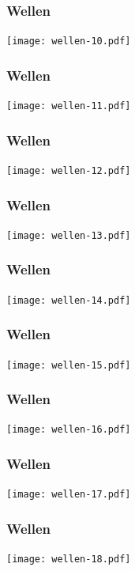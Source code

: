 \documentclass{beamer}
\begin{document}
\begin{frame}
\frametitle{Wellen}
\begin{center}
\texttt{[image: wellen-10.pdf]}
\end{center}
\end{frame}

\begin{frame}
\frametitle{Wellen}
\begin{center}
\texttt{[image: wellen-11.pdf]}
\end{center}
\end{frame}

\begin{frame}
\frametitle{Wellen}
\begin{center}
\texttt{[image: wellen-12.pdf]}
\end{center}
\end{frame}

\begin{frame}
\frametitle{Wellen}
\begin{center}
\texttt{[image: wellen-13.pdf]}
\end{center}
\end{frame}

\begin{frame}
\frametitle{Wellen}
\begin{center}
\texttt{[image: wellen-14.pdf]}
\end{center}
\end{frame}

\begin{frame}
\frametitle{Wellen}
\begin{center}
\texttt{[image: wellen-15.pdf]}
\end{center}
\end{frame}

\begin{frame}
\frametitle{Wellen}
\begin{center}
\texttt{[image: wellen-16.pdf]}
\end{center}
\end{frame}

\begin{frame}
\frametitle{Wellen}
\begin{center}
\texttt{[image: wellen-17.pdf]}
\end{center}
\end{frame}

\begin{frame}
\frametitle{Wellen}
\begin{center}
\texttt{[image: wellen-18.pdf]}
\end{center}
\end{frame}
\end{document}
